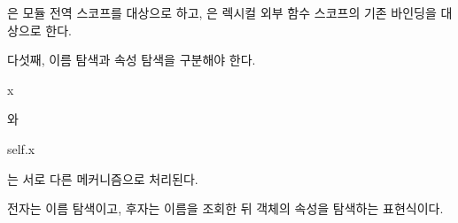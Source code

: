 은 모듈 전역 스코프를 대상으로 하고, 은 렉시컬 외부 함수 스코프의 기존 바인딩을 대상으로 한다.

\begin{dhknote}
\begin{dhksmry}[centered]
다섯째, 이름 탐색과 속성 탐색을 구분해야 한다.
\end{dhksmry}
\end{dhknote}

\begin{dhkcode}
x
\end{dhkcode}

와

\begin{dhkcode}
self.x
\end{dhkcode}

는 서로 다른 메커니즘으로 처리된다.

전자는 이름 탐색이고, 후자는  이름을 조회한 뒤 객체의 속성을 탐색하는 표현식이다.